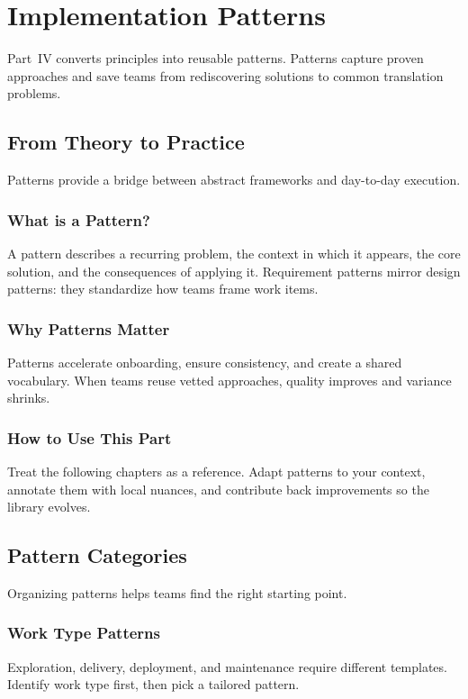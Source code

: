 \chapter{Implementation Patterns}
\label{ch:implementation-patterns}

Part~IV converts principles into reusable patterns. Patterns capture proven approaches and save teams from rediscovering solutions to common translation problems.

\section{From Theory to Practice}
\label{sec:theory-to-practice}

Patterns provide a bridge between abstract frameworks and day-to-day execution.

\subsection{What is a Pattern?}
A pattern describes a recurring problem, the context in which it appears, the core solution, and the consequences of applying it. Requirement patterns mirror design patterns: they standardize how teams frame work items.

\subsection{Why Patterns Matter}
Patterns accelerate onboarding, ensure consistency, and create a shared vocabulary. When teams reuse vetted approaches, quality improves and variance shrinks.

\subsection{How to Use This Part}
Treat the following chapters as a reference. Adapt patterns to your context, annotate them with local nuances, and contribute back improvements so the library evolves.

\section{Pattern Categories}
\label{sec:pattern-categories}

Organizing patterns helps teams find the right starting point.

\subsection{Work Type Patterns}
Exploration, delivery, deployment, and maintenance require different templates. Identify work type first, then pick a tailored pattern.


